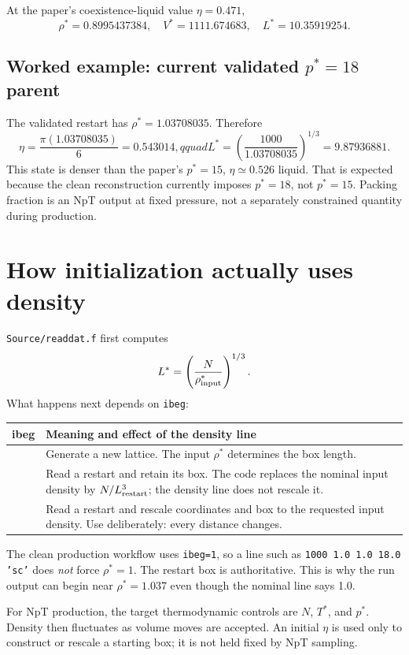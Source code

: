 \documentclass[11pt,a4paper]{article}
\newcommand{\code}[1]{\texttt{#1}}
\begin{document}
At the paper's coexistence-liquid value $\eta=0.471$,
\begin{equation}
 \rho^*=0.8995437384,\quad V^*=1111.674683,\quad L^*=10.35919254.
\end{equation}

\subsection{Worked example: current validated $p^*=18$ parent}
The validated restart has $\rho^*=1.03708035$.  Therefore
\begin{equation}
 \eta=\frac{\pi(1.03708035)}{6}=0.543014,qquad
 L^*=\left(\frac{1000}{1.03708035}\right)^{1/3}=9.87936881.
\end{equation}
This state is denser than the paper's $p^*=15$, $\eta\simeq0.526$ liquid.
That is expected because the clean reconstruction currently imposes
$p^*=18$, not $p^*=15$.  Packing fraction is an NpT output at fixed pressure,
not a separately constrained quantity during production.

\section{How initialization actually uses density}
\code{Source/readdat.f} first computes
\begin{equation}
 L^*=\left(\frac{N}{\rho^*_{\rm input}}\right)^{1/3}.
\end{equation}
What happens next depends on \code{ibeg}:
\begin{longtable}{>{\ttfamily}c p{}}
\toprule
ibeg & Meaning and effect of the density line\\
\midrule
0 & Generate a new lattice.  The input $\rho^*$ determines the box length.\\
1 & Read a restart and retain its box.  The code replaces the nominal input
density by $N/L_{\rm restart}^3$; the density line does not rescale it.\\
2 & Read a restart and rescale coordinates and box to the requested input
density.  Use deliberately: every distance changes.\\
\bottomrule
\end{longtable}
The clean production workflow uses \code{ibeg=1}, so a line such as
\code{1000 1.0 1.0 18.0 'sc'} does \emph{not} force $\rho^*=1$.  The restart
box is authoritative.  This is why the run output can begin near
$\rho^*=1.037$ even though the nominal line says 1.0.

For NpT production, the target thermodynamic controls are $N$, $T^*$, and
$p^*$.  Density then fluctuates as volume moves are accepted.  An initial
$\eta$ is used only to construct or rescale a starting box; it is not held
fixed by NpT sampling.
\end{document}
